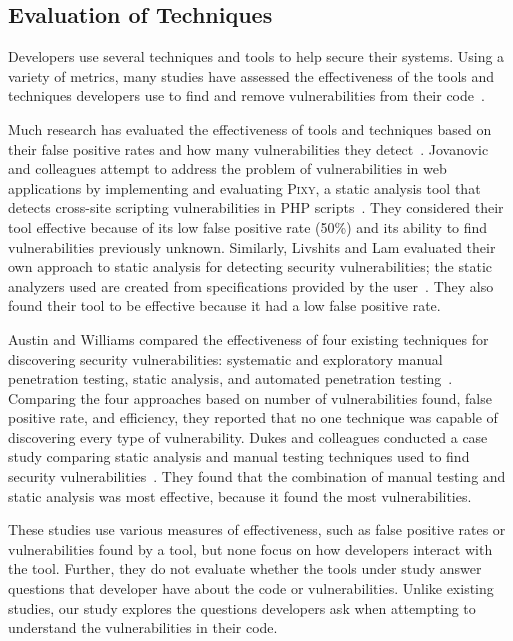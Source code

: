 \documentclass[conference]{IEEEtran}
\begin{document}
\subsection{Evaluation of Techniques}
\label{evaluation}
Developers use several techniques and tools to help secure their systems.
Using a variety of metrics, many studies have assessed the effectiveness of the tools and techniques developers use to find and remove vulnerabilities from their code~\cite{martin2005finding, austin2011one, livshits2005finding}.  

Much research has evaluated the effectiveness of tools and techniques based on their false positive rates and how many vulnerabilities they detect~\cite{jovanovic2006pixy, austin2011one, dukes2013case}. 
Jovanovic and colleagues attempt to address the problem of vulnerabilities in web applications by implementing and evaluating \textsc{Pixy}, a static analysis tool that detects cross-site scripting vulnerabilities in PHP scripts~\cite{jovanovic2006pixy}. 
They considered their tool effective because of its low false positive rate (50\%) and its ability to find vulnerabilities previously unknown. 
Similarly, Livshits and Lam evaluated their own approach to static analysis for detecting security vulnerabilities; the static analyzers used are created from specifications provided by the user~\cite{livshits2005finding}. 
They also found their tool to be effective because it had a low false positive rate. 

Austin and Williams compared the effectiveness of four existing techniques for discovering security vulnerabilities: systematic and exploratory manual  penetration testing, static analysis, and automated penetration testing~\cite{austin2011one}. 
Comparing the four approaches based on number of vulnerabilities found, false positive rate, and efficiency, they reported that no one technique was capable of discovering every type of vulnerability. 
Dukes and colleagues conducted a case study comparing static analysis and manual testing techniques used to find security vulnerabilities~\cite{dukes2013case}. 
They found that the combination of manual testing and static analysis was most effective, because it found the most vulnerabilities.


These studies use various measures of effectiveness, such as false positive rates or vulnerabilities found by a tool, but none focus on how developers interact with the tool. Further, they do not evaluate whether the tools under study answer questions that developer have about the code or vulnerabilities. 
Unlike existing studies, our study explores the questions developers ask when attempting to understand the vulnerabilities in their code.
\end{document}
